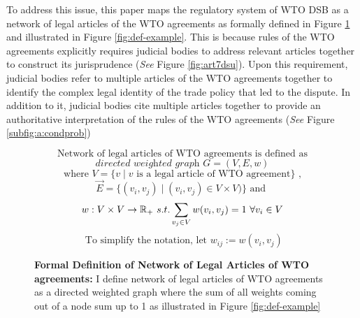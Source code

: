 To address this issue,
this paper maps
the regulatory system of WTO DSB
as a network of legal articles
of the WTO agreements as formally defined in Figure \ref{fig:def} and illustrated in Figure \ref{fig:def-example}. This is because rules of the WTO agreements
explicitly requires judicial bodies to address
relevant articles together to construct its jurisprudence (\textit{See} Figure \ref{fig:art7dsu}).
Upon this requirement, judicial bodies refer to
multiple articles of the WTO agreements together
to identify the complex legal identity of the trade policy that led to the dispute.
In addition to it, judicial bodies cite multiple articles together
to provide an authoritative interpretation of the rules of the WTO agreements (\textit{See} Figure \ref{subfig:a:condprob})

\begin{figure}[ht]
    \[\text{Network of legal articles of WTO agreements is defined as}\] %
    \[ \textit{directed weighted graph }G = (V, E, w) \]
    \[\text{ where } V = \{v \mid v\text{ is a legal article of WTO agreement}\}  \text{ , } \]
    \[\vec{E} = \{(v_i, v_j) \mid (v_i, v_j)\in V \times V)\} \text{ and } \]
    \[w : V \times V \to \Bbb R_{+} \text{ } s.t. \sum_{v_j\in V}{w(v_i, v_j)} = 1 \text{ } \forall v_i \in V \]%
    \[\text{ To simplify the notation, let } w_{ij} := w(v_i, v_j)\]
    \caption{\textbf{Formal Definition of Network of Legal Articles of WTO agreements: }I define network of legal articles of WTO agreements
        as a directed weighted graph where the sum of all weights coming out of a node sum up to 1 as illustrated in Figure \ref{fig:def-example}}
    \label{fig:def}
\end{figure}



